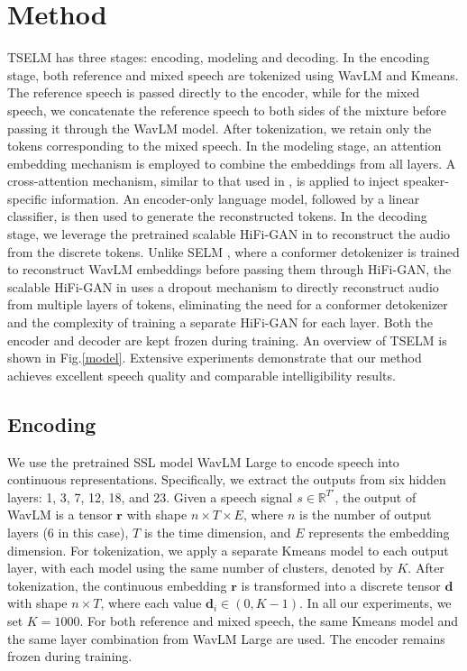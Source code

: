 \documentclass[conference]{IEEEtran}
\begin{document}
\section{Method}
TSELM has three stages: encoding, modeling and decoding. In the encoding stage, both reference and mixed speech are tokenized using WavLM and Kmeans. The reference speech is passed directly to the encoder, while for the mixed speech, we concatenate the reference speech to both sides of the mixture before passing it through the WavLM model. After tokenization, we retain only the tokens corresponding to the mixed speech.
In the modeling stage, an attention embedding mechanism is employed to combine the embeddings from all layers. A cross-attention mechanism, similar to that used in \cite{usef_tes}, is applied to inject speaker-specific information. An encoder-only language model, followed by a linear classifier, is then used to generate the reconstructed tokens.
In the decoding stage, we leverage the pretrained scalable HiFi-GAN in \cite{unit_hifi} to reconstruct the audio from the discrete tokens. Unlike SELM \cite{selm}, where a conformer detokenizer is trained to reconstruct WavLM embeddings before passing them through HiFi-GAN, the scalable HiFi-GAN in \cite{unit_hifi} uses a dropout mechanism to directly reconstruct audio from multiple layers of tokens, eliminating the need for a conformer detokenizer and the complexity of training a separate HiFi-GAN for each layer. Both the encoder and decoder are kept frozen during training. An overview of TSELM is shown in Fig.\ref{model}.
Extensive experiments demonstrate that our method achieves excellent speech quality and comparable intelligibility results.


\subsection{Encoding}

We use the pretrained SSL model WavLM Large \cite{wavlm} to encode speech into continuous representations. Specifically, we extract the outputs from six hidden layers: 1, 3, 7, 12, 18, and 23. Given a speech signal \(s \in \mathbb{R}^{T'}\), the output of WavLM is a tensor \(\bm{r}\) with shape \(n \times T \times E\), where \(n\) is the number of output layers (6 in this case), \(T\) is the time dimension, and \(E\) represents the embedding dimension. For tokenization, we apply a separate Kmeans model to each output layer, with each model using the same number of clusters, denoted by \(K\). After tokenization, the continuous embedding \(\bm{r}\) is transformed into a discrete tensor \(\bm{d}\) with shape \(n \times T\), where each value \(\bm{d}_{i} \in (0, K-1) \). In all our experiments, we set \(K = 1000\). For both reference and mixed speech, the same Kmeans model and the same layer combination from WavLM Large are used. The encoder remains frozen during training.
\end{document}

